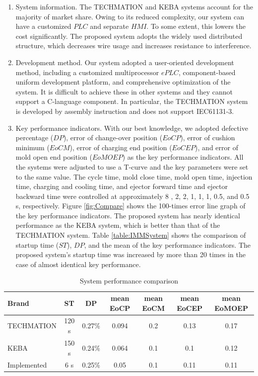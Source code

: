 \documentclass[journal,UTF8]{IEEEtran}
\begin{document}
\begin{enumerate}
	\item System information. The TECHMATION and KEBA systems account for the majority of market share. Owing to its reduced complexity, our system can have a customized $PLC$ and separate $HMI$. To some extent, this lowers the cost significantly. The proposed system adopts the widely used distributed structure, which decreases wire usage and increases resistance to interference.
	\item Development method. Our system adopted a user-oriented development method, including a customized multiprocessor $ePLC$, component-based uniform development platform, and comprehensive optimization of the system. It is difficult to achieve these in other systems and they cannot support a C-language component. In particular, the TECHMATION system is developed by assembly instruction and does not support IEC61131-3.
	\item Key performance indicators. With our best knowledge, we adopted defective percentage ($DP$), error of change-over position ($EoCP$), error of cushion minimum ($EoCM$), error of charging end position ($EoCEP$), and error of mold open end position ($EoMOEP$) as the key performance indicators. All the systems were adjusted to use a T-curve and the key parameters were set to the same value. The cycle time, mold close time, mold open time, injection time, charging and cooling time, and ejector forward time and ejector backward time were controlled at approximately 8 , 2, 2, 1, 1, 1, 0.5, and 0.5 s, respectively. Figure \ref{fig:Compare} shows the 100-times error line graph of the key performance indicators. The proposed system has nearly identical performance as the KEBA system, which is better than that of the TECHMATION system. Table \ref{table:IMMSystem} shows the comparison of startup time ($ST$), $DP$, and the mean of the key performance indicators. The proposed system's startup time was increased by more than 20 times in the case of almost identical key performance.
\end{enumerate}
\begin{table}
	\scriptsize \caption{System performance comparison}
	\label{table:ComparisonG}
	\begin{center}
		\renewcommand{\arraystretch}{1.4}
		\setlength\tabcolsep{3pt}
		\begin{tabular}{|l|c|c|c|c|c|c|}
			\hline
			Brand & ST &DP&mean EoCP&mean EoCM&mean EoCEP&mean EoMOEP\\
			\hline
			TECHMATION  & 120 s  &0.27\% &0.094 & 0.2 & 0.13 & 0.17 \\
			\hline
			KEBA        & 150 s  &0.24\% &0.064 & 0.1 & 0.1 & 0.12 \\
			\hline
			Implemented   & 6 s     &0.25\% &0.05 & 0.1 & 0.11 & 0.11\\
			\hline
		\end{tabular}
	\end{center}
\end{table}
\end{document}
